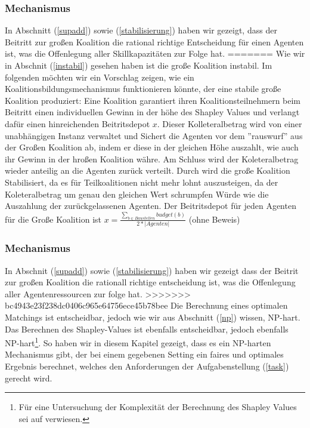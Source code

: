 \subsubsection*{Mechanismus}
In Abschnitt (\ref{supadd}) sowie (\ref{stabilisierung}) haben wir gezeigt, dass der Beitritt zur großen Koalition die rational richtige Entscheidung für einen Agenten ist, was die Offenlegung aller Skillkapazitäten zur Folge hat.
=======
Wie wir in Abschnit (\ref{instabil}) gesehen haben ist die große Koalition instabil. Im folgenden möchten wir ein Vorschlag zeigen, wie ein Koalitionsbildungsmechanismus funktionieren könnte, der eine stabile große Koalition produziert:
Eine Koalition garantiert ihren Koalitionsteilnehmern beim Beitritt einen individuellen Gewinn in der höhe des Shapley Values und verlangt dafür einen hinreichenden Beitritsdepot $x$. Dieser Kolleteralbetrag wird von einer unabhängigen Instanz verwaltet und Sichert die Agenten vor dem ''rauswurf'' aus der Großen Koalition ab, indem er diese in der gleichen Höhe auszahlt, wie auch ihr Gewinn in der hroßen Koalition währe. Am Schluss wird der Koleteralbetrag wieder anteilig an die Agenten zurück verteilt. Durch wird die große Koalition Stabilisiert, da es für Teilkoalitionen nicht mehr lohnt auszusteigen, da der Koleteralbetrag um genau den gleichen Wert schrumpfen Würde wie die Auszahlung der zurückgelassenen Agenten. Der Beitritsdepot für jeden Agenten für die Große Koalition ist $x=\frac{\sum_{b\in Baustellen} budget(b)}{2*|Agenten|}$ (ohne Beweis)

\subsubsection{Mechanismus}
\label{thmechanism}
In Abschnit (\ref{supadd}) sowie (\ref{stabilisierung}) haben wir gezeigt dass der Beitrit zur großen Koalition die rationall richtige entscheidung ist, was die Offenlegung aller Agentenressourcen zur folge hat.
>>>>>>> bc4943e23f238dc0406c965e64756ece45b78bee
Die Berechnung eines optimalen Matchings ist entscheidbar, jedoch wie wir aus Abschnitt (\ref{np}) wissen, NP-hart.
Das Berechnen des Shapley-Values ist ebenfalls entscheidbar, jedoch ebenfalls NP-hart\footnote{Für eine Untersuchung der Komplexität der Berechnung des Shapley Values sei auf \cite{conitzer2004computing} verwiesen.}.
So haben wir in diesem Kapitel gezeigt, dass es ein NP-harten Mechanismus gibt, der bei einem gegebenen Setting ein faires und optimales Ergebnis berechnet, welches den Anforderungen der Aufgabenstellung (\ref{task}) gerecht wird.
